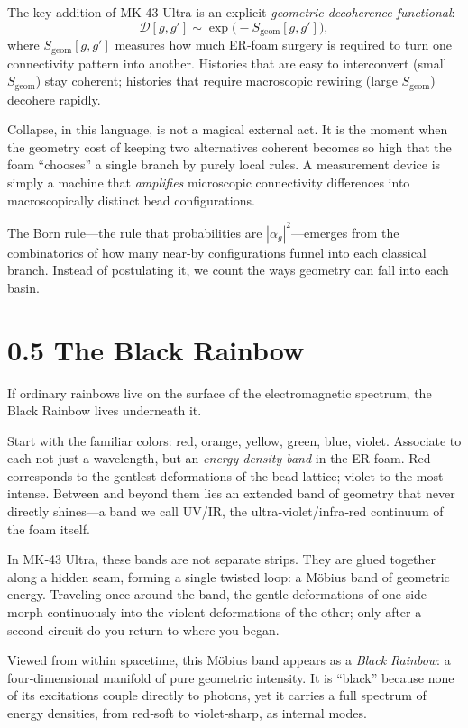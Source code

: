 The key addition of MK‑43 Ultra is an explicit \emph{geometric decoherence functional}:
\begin{equation}
\mathcal{D}[g, g'] \sim \exp\!\big( - S_{\text{geom}}[g, g'] \big),
\end{equation}
where $S_{\text{geom}}[g, g']$ measures how much ER‑foam surgery is required to turn one connectivity pattern into another. Histories that are easy to interconvert (small $S_{\text{geom}}$) stay coherent; histories that require macroscopic rewiring (large $S_{\text{geom}}$) decohere rapidly.

Collapse, in this language, is not a magical external act. It is the moment when the geometry cost of keeping two alternatives coherent becomes so high that the foam ``chooses'' a single branch by purely local rules. A measurement device is simply a machine that \emph{amplifies} microscopic connectivity differences into macroscopically distinct bead configurations.

The Born rule---the rule that probabilities are $|\alpha_g|^2$---emerges from the combinatorics of how many near‑by configurations funnel into each classical branch. Instead of postulating it, we count the ways geometry can fall into each basin.

\section*{0.5 The Black Rainbow}

If ordinary rainbows live on the surface of the electromagnetic spectrum, the Black Rainbow lives underneath it.

Start with the familiar colors: red, orange, yellow, green, blue, violet. Associate to each not just a wavelength, but an \emph{energy‑density band} in the ER‑foam. Red corresponds to the gentlest deformations of the bead lattice; violet to the most intense. Between and beyond them lies an extended band of geometry that never directly shines---a band we call UV/IR, the ultra‑violet/infra‑red continuum of the foam itself.

In MK‑43 Ultra, these bands are not separate strips. They are glued together along a hidden seam, forming a single twisted loop: a Möbius band of geometric energy. Traveling once around the band, the gentle deformations of one side morph continuously into the violent deformations of the other; only after a second circuit do you return to where you began.

Viewed from within spacetime, this Möbius band appears as a \emph{Black Rainbow}: a four‑dimensional manifold of pure geometric intensity. It is ``black'' because none of its excitations couple directly to photons, yet it carries a full spectrum of energy densities, from red‑soft to violet‑sharp, as internal modes.

